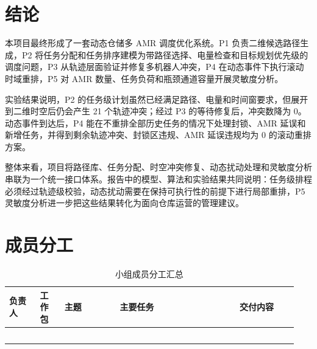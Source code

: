 \documentclass[12pt,a4paper,UTF8]{ctexart}
\begin{document}







\newpage


\newpage


\section{结论}

本项目最终形成了一套动态仓储多 AMR 调度优化系统。P1 负责二维候选路径生成，P2 将任务分配和任务排序建模为带路径选择、电量检查和目标规划优先级的调度问题，P3 从轨迹层面验证并修复多机器人冲突，P4 在动态事件下执行滚动时域重排，P5 对 AMR 数量、任务负荷和瓶颈通道容量开展灵敏度分析。

实验结果说明，P2 的任务级计划虽然已经满足路径、电量和时间窗要求，但展开到二维时空后仍会产生 21 个轨迹冲突；经过 P3 的等待修复后，冲突数降为 0。动态事件到达后，P4 能在不重排全部历史任务的情况下处理封锁、AMR 延误和新增任务，并得到剩余轨迹冲突、封锁区违规、AMR 延误违规均为 0 的滚动重排方案。

整体来看，项目将路径库、任务分配、时空冲突修复、动态扰动处理和灵敏度分析串联为一个统一接口体系。报告中的模型、算法和实验结果共同说明：任务级排程必须经过轨迹级校验，动态扰动需要在保持可执行性的前提下进行局部重排，P5 灵敏度分析进一步把这些结果转化为面向仓库运营的管理建议。

\projectreference

\clearpage
\appendix
\section{成员分工}

\begin{table}[H]
\centering
\small
\setlength{\tabcolsep}{3pt}
\renewcommand{\arraystretch}{1.08}
\begin{tabular}{@{}p{0.10\linewidth}p{0.08\linewidth}p{0.18\linewidth}p{0.39\linewidth}p{0.19\linewidth}@{}}
\toprule
负责人 & 工作包 & 主题 & 主要任务 & 交付内容 \\
\midrule
\\
\\
\\
\\
\\
\bottomrule
\end{tabular}
\caption{小组成员分工汇总}
\label{tab:appendix-member-division}
\end{table}
\end{document}
